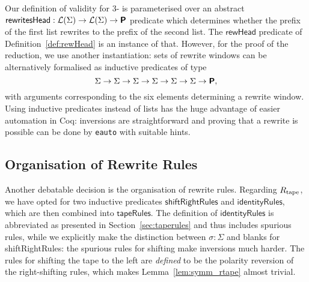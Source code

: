 Our definition of validity for 3-\PR{} is parameterised over an abstract $\textsf{rewritesHead} : \mathcal{L} (\Sigma) \rightarrow \mathcal{L} (\Sigma) \rightarrow \textsf{\bfseries P}$ predicate which determines whether the prefix of the first list rewrites to the prefix of the second list. The $\textsf{rewHead}$ predicate of Definition~\ref{def:rewHead} is an instance of that.
However, for the proof of the reduction, we use another instantiation: sets of rewrite windows can be alternatively formalised as inductive predicates of type
\[ \Sigma \rightarrow \Sigma \rightarrow \Sigma \rightarrow \Sigma \rightarrow \Sigma \rightarrow \Sigma \rightarrow \textsf{\bfseries P}, \]
with arguments corresponding to the six elements determining a rewrite window. 
Using inductive predicates instead of lists has the huge advantage of easier automation in Coq: inversions are straightforward and proving that a rewrite is possible can be done by \texttt{eauto} with suitable hints.

\subsection{Organisation of Rewrite Rules}
Another debatable decision is the organisation of rewrite rules. Regarding $R_{\text{tape}}$, we have opted for two inductive predicates $\textsf{shiftRightRules}$ and $\textsf{identityRules}$, which are then combined into $\textsf{tapeRules}$. The definition of $\textsf{identityRules}$ is abbreviated as presented in Section~\ref{sec:taperules} and thus includes spurious rules, while we explicitly make the distinction between $\sigma : \Sigma$ and blanks for \textsf{shiftRightRules}: the spurious rules for shifting make inversions much harder. 
The rules for shifting the tape to the left are \emph{defined} to be the polarity reversion of the right-shifting rules, which makes Lemma~\ref{lem:symm_rtape} almost trivial.

